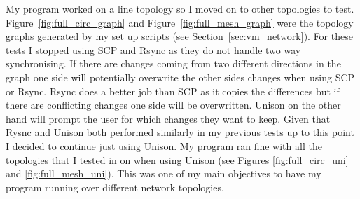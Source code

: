 \documentclass[12pt]{article}
\begin{document}
My program worked on a line topology so I moved on to other topologies
to test. Figure~\ref{fig:full_circ_graph} and Figure~\ref{fig:full_mesh_graph}
were the topology graphs generated by my set up scripts (see
Section~\ref{sec:vm_network}). 
For these tests I stopped using SCP and Rsync as they do
not handle two way synchronising. If there
are changes coming from two different directions
in the graph one side will potentially overwrite
the other sides changes when using SCP or Rsync.
Rsync does a better job than SCP as it copies the
differences but if there are conflicting changes
one side will be overwritten. Unison on the other
hand will prompt the user for which changes they
want to keep. Given that Rysnc and Unison both
performed similarly in my previous tests up to
this point I decided to continue just using Unison.
My program ran fine with all the topologies that
I tested in on when using Unison (see Figures
\ref{fig:full_circ_uni} and \ref{fig:full_mesh_uni}).
This was one of my main objectives to have my
program running over different network topologies.
\end{document}
